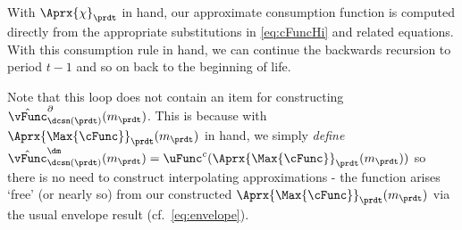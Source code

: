With $\Aprx{\chi}_{\prdt}$ in hand, our approximate consumption function
is computed directly from the appropriate substitutions in \eqref{eq:cFuncHi}
and related equations.  With this consumption
rule in hand, we can continue the backwards recursion to period $t-1$
and so on back to the beginning of life.

Note that this loop does not contain an item for constructing $\hat{\vFunc}_{\dcsn(\prdt)}^{\partial}(m_{\prdt})$. This is because with $\Aprx{\Max{\cFunc}}_{\prdt}(m_{\prdt})$ in hand, we simply \textit{define} $\hat{\vFunc}^{\dm}_{\dcsn(\prdt)}(m_{\prdt}) = \uFunc^{c}(\Aprx{\Max{\cFunc}}_{\prdt}(m_{\prdt}))$ so there is no need to construct interpolating approximations - the function arises `free' (or nearly so) from our constructed $\Aprx{\Max{\cFunc}}_{\prdt}(m_{\prdt})$ via the usual envelope result (cf.\ \eqref{eq:envelope}).


